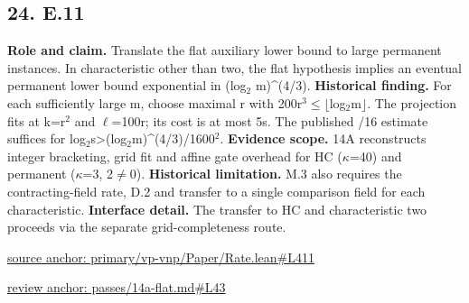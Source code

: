 \documentclass[11pt,letterpaper]{article}
\theoremstyle{definition}\newtheorem{definition}[theorem]{Definition}\newtheorem{example}[theorem]{Example}
\theoremstyle{remark}\newtheorem{remark}[theorem]{Remark}
\begin{document}
\subsection*{24. E.11}
\textbf{Role and claim.} Translate the flat auxiliary lower bound to large permanent instances. In characteristic other than two, the flat hypothesis implies an eventual permanent lower bound exponential in (log\ensuremath{{}_2} m)\textasciicircum{}(4/3).
\textbf{Historical finding.} For each sufficiently large m, choose maximal r with 200r\ensuremath{{}^3}\ensuremath{\le}\ensuremath{\lfloor}log\ensuremath{{}_2}m\ensuremath{\rfloor}. The projection fits at k=r\ensuremath{{}^2} and \ensuremath{\ell}=100r; its cost is at most 5s. The published /16 estimate suffices for log\ensuremath{{}_2}s>(log\ensuremath{{}_2}m)\textasciicircum{}(4/3)/1600\ensuremath{{}^2}.
\textbf{Evidence scope.} 14A reconstructs integer bracketing, grid fit and affine gate overhead for HC (\ensuremath{\kappa}=40) and permanent (\ensuremath{\kappa}=3, 2\ensuremath{\ne}0).
\textbf{Historical limitation.} M.3 also requires the contracting-field rate, D.2 and transfer to a single comparison field for each characteristic.
\textbf{Interface detail.} The transfer to HC and characteristic two proceeds via the separate grid-completeness route.
\par\href{https://github.com/nousentllc/VP-VNP-Review/blob/8a7976933b6b2b4ffda1ad3a0dfb5fc6b6f023e8/primary/vp-vnp/Paper/Rate.lean\#L411}{source anchor: primary/vp-vnp/Paper/Rate.lean\#L411}
\par\href{https://github.com/nousentllc/VP-VNP-Review/blob/8a7976933b6b2b4ffda1ad3a0dfb5fc6b6f023e8/passes/14a-flat.md\#L43}{review anchor: passes/14a-flat.md\#L43}
\goodbreak
{}
\hypertarget{claim.25}{}
\end{document}
